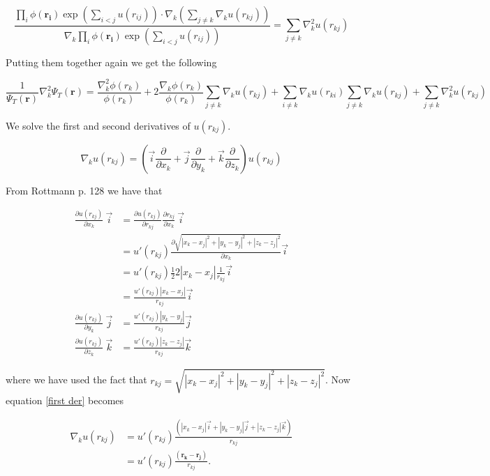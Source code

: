 $$\frac{\prod_{i} \phi (\mathbf{r_i}) \exp \left(\sum_{i<j}u(r_{ij})\right) \cdot \nabla_k \left(\sum_{j\ne k} \nabla_k u(r_{kj}) \right)}{\nabla_k \prod_{i} \phi (\mathbf{r_i}) \exp \left(\sum_{i<j}u(r_{ij})\right)} = \sum_{j \ne k} \nabla_k^2 u(r_{kj})$$

Putting them together again we get the following

\begin{equation} \label{eq:local energy 2}
\frac{1}{\Psi_T(\mathbf{r})}\nabla_k^2 \Psi_T(\mathbf{r}) = \frac{\nabla_k^2 \phi(r_k)}{\phi(r_k)} + 2\frac{\nabla_k \phi(r_k)}{\phi(r_k)} \sum_{j \ne k} \nabla_k u(r_{kj}) + \sum_{i \ne k} \nabla_k u(r_{ki}) \sum_{j \ne k} \nabla_k u(r_{kj}) + \sum_{j \ne k} \nabla_k^2 u(r_{kj})
\end{equation}


We solve the first and second derivatives of $u(r_{kj})$.

\begin{equation} \label{first der}
\nabla_k u(r_{kj}) = \left(\vec{i} \frac{\partial}{\partial x_k} + \vec{j} \frac{\partial}{\partial y_k} + \vec{k} \frac{\partial}{\partial z_k}\right) u(r_{kj})
\end{equation}

From Rottmann p. 128 we have that

\begin{align*}
\frac{\partial u(r_{kj})}{\partial x_k}\ \vec{i}  &= \frac{\partial u(r_{kj})}{\partial r_{kj}} \frac{\partial r_{kj}}{\partial x_k} \ \vec{i}\\
&= u'(r_{kj}) \frac{\partial \sqrt{|x_k - x_j|^2 + |y_k - y_j|^2 + |z_k - z_j|^2}}{\partial x_k} \vec{i}\\
&=u'(r_{kj}) \frac{1}{2} 2 |x_k - x_j|\frac{1}{r_{kj}} \vec{i}\\
&=\frac{u'(r_{kj})|x_k - x_j|}{r_{kj}} \vec{i}\\
\frac{\partial u(r_{kj})}{\partial y_k}\ \vec{j}  &= \frac{u'(r_{kj})|y_k - y_j|}{r_{kj}} \vec{j}\\
\frac{\partial u(r_{kj})}{\partial z_k}\ \vec{k}  &=\frac{u'(r_{kj})|z_k - z_j|}{r_{kj}} \vec{k}
\end{align*}

where we have used the fact that $r_{kj} = \sqrt{|x_k - x_j|^2 + |y_k - y_j|^2 + |z_k - z_j|^2}$. Now equation \eqref{first der} becomes

\begin{align*}
\nabla_k u(r_{kj}) &= u'(r_{kj})\frac{(|x_k - x_j|\vec{i} + |y_k - y_j|\vec{j} + |z_k - z_j|\vec{k})}{r_{kj}}\\
&= u'(r_{kj}) \frac{(\boldsymbol{r_k} - \boldsymbol{r_j})}{r_{kj}}.
\end{align*}

